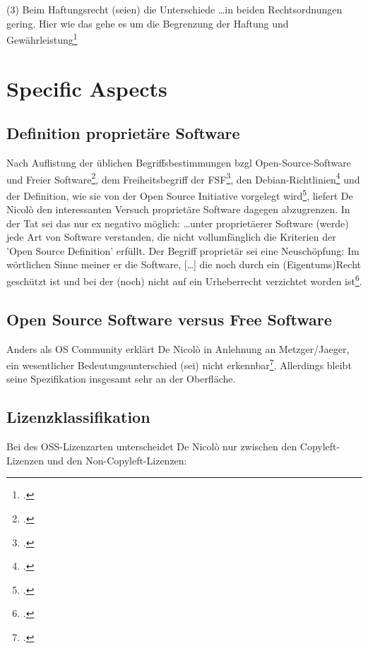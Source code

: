\documentclass[DIV=calc,BCOR=5mm,11pt,headings=small,oneside,abstract=true, toc=bib]{scrartcl}
\begin{document}
(3) Beim Haftungsrecht \glqq{}(seien) die Unterschiede \ldots in beiden
Rechtsordnungen gering\grqq{}. Hier wie das gehe es um \glqq{}die Begrenzung der
Haftung und Gewährleistung\grqq{}\footcite[vgl.][160]{DeNicolo2010a}
 
\section{Specific Aspects}

\subsection{Definition proprietäre Software}
Nach Auflistung der üblichen Begriffsbestimmungen bzgl Open-Source-Software und
Freier Software\footcite[vgl.][11]{DeNicolo2010a}, dem \glqq{}Freiheitsbegriff
der FSF\grqq{}\footcite[vgl.][11f]{DeNicolo2010a}, den
Debian-Richtlinien\footcite[vgl.][12]{DeNicolo2010a} und der Definition, wie sie
von der Open Source Initiative vorgelegt
wird\footcite[vgl.][13f]{DeNicolo2010a}, liefert De Nicolò den interessanten
Versuch \glqq{}proprietäre Software\grqq{} dagegen abzugrenzen. In der Tat sei
das nur ex negativo möglich: \glqq{}\ldots unter proprietäerer Software (werde)
jede Art von Software verstanden, die nicht vollumfänglich die Kriterien der
'Open Source Definition' erfüllt. Der Begriff \glqq{}proprietär\grqq{} sei eine
\glqq{}Neuschöpfung\grqq{}: \glqq{}Im wörtlichen Sinne\grqq{} meiner er die
Software, \glqq{}[\ldots] die noch durch ein (Eigentums)Recht geschützt
ist und bei der (noch) nicht auf ein Urheberrecht verzichtet worden
ist\grqq{}\footcite[vgl.][14f]{DeNicolo2010a}.

\subsection{Open Source Software versus Free Software}

Anders als OS Community erklärt De Nicolò in Anlehnung an Metzger/Jaeger,
\glqq{}ein wesentlicher Bedeutungsunterschied (sei) nicht
erkennbar\grqq{}\footcite[vgl.][11]{DeNicolo2010a}. Allerdings bleibt seine
Spezifikation insgesamt sehr an der Oberfläche.

\subsection{Lizenzklassifikation}

Bei des \glqq{}OSS-Lizenzarten\grqq{} unterscheidet De Nicolò nur zwischen den
\glqq{}Copyleft-Lizenzen\grqq{} und den \glqq{}Non-Copyleft-Lizenzen\grqq{}: 
\end{document}
